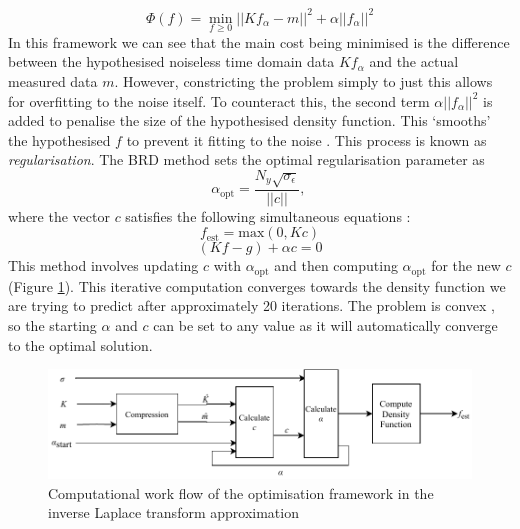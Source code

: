 \begin{equation}
    \Phi(f) = \min_{f\geq0}  ||Kf_\alpha - m||^2 + \alpha||f_{\alpha}||^2
    \label{eq:minimseError1981Optimise}
\end{equation}    
In this framework we can see that the main cost being minimised is the difference between the hypothesised noiseless time domain data $Kf_\alpha$ and the actual measured data $m$. However, constricting the problem simply to just this allows for overfitting to the noise itself. To counteract this, the second term $\alpha||f_{\alpha}||^2$ is added to penalise the size of the hypothesised density function. This `smooths' the hypothesised $f$ to prevent it fitting to the noise \cite{RegularizationElden1977algorithms}. This process is known as \textit{regularisation}.
The BRD method \cite{BulterReedsDawsonMethod1981} sets the optimal regularisation parameter as
\begin{equation}
    \alpha_{\text{opt}} =  \frac{N_y \sqrt{ \sigma_{\epsilon} } }{||c||} 
    \text{, }
    \label{eq:optAlphaOptimise}
\end{equation} 
where the vector $c$ satisfies the following simultaneous equations \cite{BulterReedsDawsonMethod1981}:
\begin{equation}
    f_{\text{est}} = \text{max}(0, Kc)
    \label{eq:optC1}
\end{equation}  
\begin{equation}
    (Kf - g) + \alpha c = 0
    \label{eq:optC2}
\end{equation}  
    This method involves updating $c$ with $\alpha_{\text{opt}}$ and then computing $\alpha_{\text{opt}}$ for the new $c$ (Figure \ref{fig:2002Optimisation}). This iterative computation converges towards the density function we are trying to predict after approximately 20 iterations. The problem is convex \cite{BulterReedsDawsonMethod1981}, so the starting $\alpha$ and $c$ can be set to any value as it will automatically converge to the optimal solution. 

\begin{figure}[ht!]
    \centering
    \includegraphics[width=\textwidth]{backgroundVector/BlockDiagram2002Optimisation.pdf}
    \caption{Computational work flow of the optimisation framework in the inverse Laplace transform approximation}
    \label{fig:2002Optimisation}
\end{figure}

